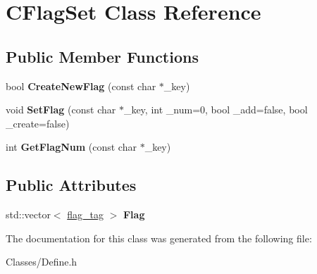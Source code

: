 \hypertarget{class_c_flag_set}{}\section{C\+Flag\+Set Class Reference}
\label{class_c_flag_set}
\subsection*{Public Member Functions}
\begin{DoxyCompactItemize}
\item 
bool {\bfseries Create\+New\+Flag} (const char $\ast$\+\_\+key)\hypertarget{class_c_flag_set_a2195c9e21a9fafebe3088ee295f7abab}{}\label{class_c_flag_set_a2195c9e21a9fafebe3088ee295f7abab}

\item 
void {\bfseries Set\+Flag} (const char $\ast$\+\_\+key, int \+\_\+num=0, bool \+\_\+add=false, bool \+\_\+create=false)\hypertarget{class_c_flag_set_a599557b906f59a874eae13e6d21db76e}{}\label{class_c_flag_set_a599557b906f59a874eae13e6d21db76e}

\item 
int {\bfseries Get\+Flag\+Num} (const char $\ast$\+\_\+key)\hypertarget{class_c_flag_set_a618ab08a5941e5c3df9eaef7c9ac610d}{}\label{class_c_flag_set_a618ab08a5941e5c3df9eaef7c9ac610d}

\end{DoxyCompactItemize}
\subsection*{Public Attributes}
\begin{DoxyCompactItemize}
\item 
std\+::vector$<$ \hyperlink{structflag__tag}{flag\+\_\+tag} $>$ {\bfseries Flag}\hypertarget{class_c_flag_set_ad92fe96833f1bafb3919e579f5390cb1}{}\label{class_c_flag_set_ad92fe96833f1bafb3919e579f5390cb1}

\end{DoxyCompactItemize}


The documentation for this class was generated from the following file\+:\begin{DoxyCompactItemize}
\item 
Classes/Define.\+h\end{DoxyCompactItemize}
